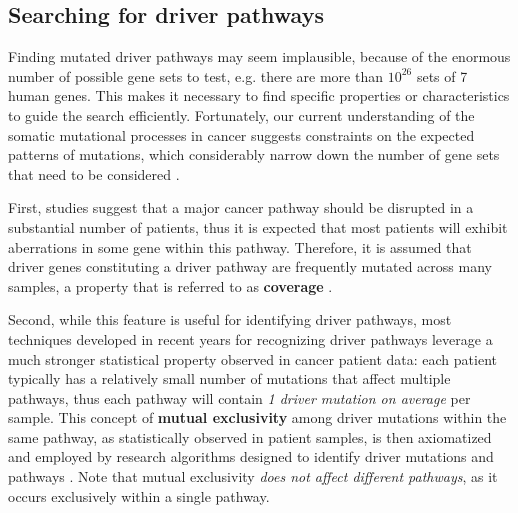 %

\subsection{Searching for driver pathways}

Finding mutated driver pathways may seem implausible, because of the enormous number of possible gene sets to test, e.g. there are more than $10^{26}$ sets of 7 human genes. This makes it necessary to find specific properties or characteristics to guide the search efficiently. Fortunately, our current understanding of the somatic mutational processes in cancer suggests constraints on the expected patterns of mutations, which considerably narrow down the number of gene sets that need to be considered \cite{dendrix}.

First, studies suggest that a major cancer pathway should be disrupted in a substantial number of patients, thus it is expected that most patients will exhibit aberrations in some gene within this pathway. Therefore, it is assumed that driver genes constituting a driver pathway are frequently mutated across many samples, a property that is referred to as \textbf{coverage} \cite{dendrix}.

Second, while this feature is useful for identifying driver pathways, most techniques developed in recent years for recognizing driver pathways leverage a much stronger statistical property observed in cancer patient data: each patient typically has a relatively small number of mutations that affect multiple pathways, thus each pathway will contain \textit{1 driver mutation on average} per sample. This concept of \textbf{mutual exclusivity} among driver mutations within the same pathway, as statistically observed in patient samples, is then axiomatized and employed by research algorithms designed to identify driver mutations and pathways \cite{multi-dendrix}. Note that mutual exclusivity \textit{does not affect different pathways}, as it occurs exclusively within a single pathway.

